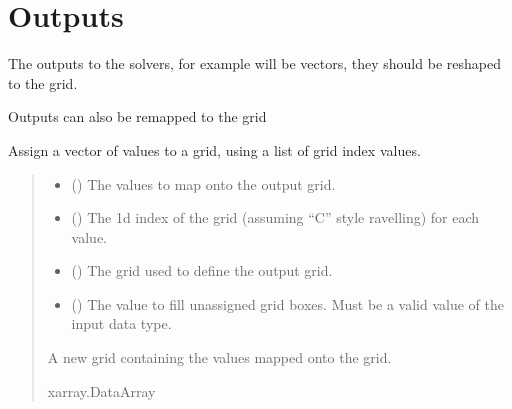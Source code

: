 \documentclass[letterpaper,10pt,english]{sphinxmanual}
\begin{document}
\section{Outputs}
\label{\detokenize{kriging:outputs}}
\sphinxAtStartPar
The outputs to the solvers,  for example will be
vectors, they should be re\sphinxhyphen{}shaped to the grid.

\sphinxAtStartPar
Outputs can also be re\sphinxhyphen{}mapped to the grid

\begin{fulllineitems}
\label{\detokenize{kriging:glomar_gridding.grid.assign_to_grid}}
\pysigstartsignatures
\pysiglinewithargsret
{}
{\sphinxparamcomma {}\sphinxparamcomma {}\sphinxparamcomma {}}
{}
\pysigstopsignatures
\sphinxAtStartPar
Assign a vector of values to a grid, using a list of grid index values.
\begin{quote}\begin{description}
\begin{itemize}
\item {}
\sphinxAtStartPar
{} () \textendash{} The values to map onto the output grid.

\item {}
\sphinxAtStartPar
{} () \textendash{} The 1d index of the grid (assuming “C” style ravelling) for each value.

\item {}
\sphinxAtStartPar
{} () \textendash{} The grid used to define the output grid.

\item {}
\sphinxAtStartPar
{} () \textendash{} The value to fill unassigned grid boxes. Must be a valid value of the
input  data type.

\end{itemize}

\sphinxAtStartPar
{} \textendash{} A new grid containing the values mapped onto the grid.

\sphinxAtStartPar
xarray.DataArray

\end{description}\end{quote}

\end{fulllineitems}
\end{document}
